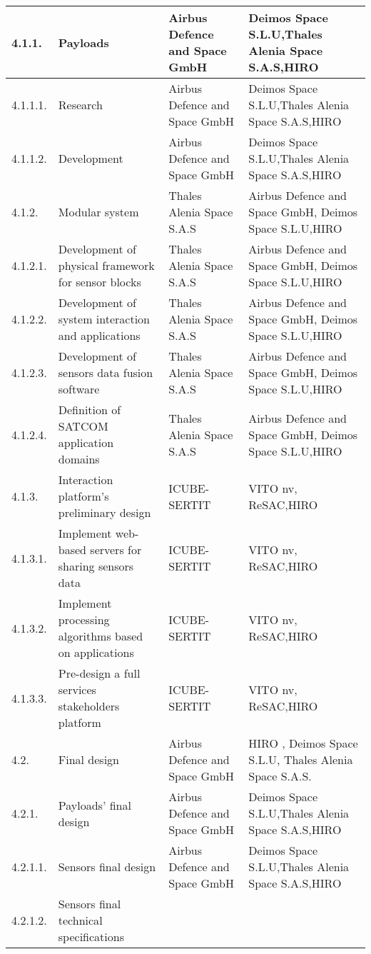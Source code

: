 \begin{longtable}[H]{l p{4cm} p{3.8cm} p{4cm}}
	\\ \midrule
	4.1.1. & Payloads &
	 Airbus Defence and Space GmbH&Deimos Space S.L.U,Thales Alenia Space S.A.S,HIRO
	\\ \midrule
	4.1.1.1. & Research &
	 Airbus Defence and Space GmbH&Deimos Space S.L.U,Thales Alenia Space S.A.S,HIRO
	\\ \midrule
	4.1.1.2. & Development &
	 Airbus Defence and Space GmbH&Deimos Space S.L.U,Thales Alenia Space S.A.S,HIRO
	\\ \midrule
	4.1.2. & Modular system&Thales Alenia Space S.A.S&Airbus Defence and Space GmbH, Deimos Space S.L.U,HIRO
	\\ \midrule
	4.1.2.1. & Development of physical framework for sensor blocks&Thales Alenia Space S.A.S&Airbus Defence and Space GmbH, Deimos Space S.L.U,HIRO
	\\ \midrule
	4.1.2.2. & Development of system interaction and applications&Thales Alenia Space S.A.S&Airbus Defence and Space GmbH, Deimos Space S.L.U,HIRO
	\\ \midrule
	4.1.2.3. & Development of sensors data fusion software&Thales Alenia Space S.A.S&Airbus Defence and Space GmbH, Deimos Space S.L.U,HIRO
	\\ \midrule
	4.1.2.4. &Definition of SATCOM application domains&Thales Alenia Space S.A.S&Airbus Defence and Space GmbH, Deimos Space S.L.U,HIRO
	\\ \midrule
	4.1.3. & Interaction platform's preliminary design &
	ICUBE-SERTIT&VITO nv, ReSAC,HIRO
	\\ \midrule
	4.1.3.1. & Implement web-based servers for sharing sensors data &
	ICUBE-SERTIT&VITO nv, ReSAC,HIRO
	\\ \midrule
	4.1.3.2. & Implement processing algorithms based on applications &
	ICUBE-SERTIT&VITO nv, ReSAC,HIRO
	\\ \midrule
	4.1.3.3. & Pre-design a full services stakeholders platform &
	ICUBE-SERTIT&VITO nv, ReSAC,HIRO
	\\ \midrule
	4.2. & Final design & 
	Airbus Defence and Space GmbH& HIRO , Deimos Space S.L.U, Thales Alenia Space S.A.S.
	\\ \midrule
	4.2.1. & Payloads' final design &
	Airbus Defence and Space GmbH&Deimos Space S.L.U,Thales Alenia Space S.A.S,HIRO
	\\ \midrule
	4.2.1.1. & Sensors final design &
	Airbus Defence and Space GmbH&Deimos Space S.L.U,Thales Alenia Space S.A.S,HIRO
	\\ \midrule
	4.2.1.2. & Sensors final technical specifications &

\end{longtable}
